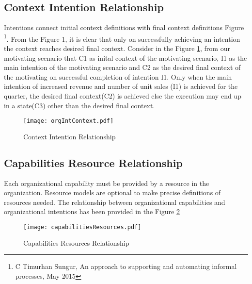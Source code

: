 \subsection{Context Intention Relationship}
\label{sec:ctxintrel}
Intentions connect initial context definitions with final context definitions Figure \footnote{C Timurhan Sungur, An approach to supporting and automating informal processes, May 2015}. From the Figure \ref{fig:orgIntentions}, it is clear that only on successfully achieving an intention the context reaches desired final context. Consider in the Figure \ref{fig:orgIntentions}, from our motivating scenario that C1 as inital context of the motivating scenario, I1 as the main intention of the motivating scenario and C2 as the desired final context of the motivating on successful completion of intention I1. Only when the main intention of increased revenue and number of unit sales (I1) is achieved for the quarter, the desired final context(C2) is achieved else the execution may end up in a state(C3) other than the desired final context. 

\begin{figure}
	\centering
	\texttt{[image: orgIntContext.pdf]}
	\caption{Context Intention Relationship}
	\label{fig:orgIntentions}
\end{figure}

\subsection{Capabilities Resource Relationship}
\label{sec:capIntRel}
Each organizational capability must be provided by a resource in the organization. Resource models are optional to make precise definitions of resources needed. The relationship between organizational capabilities and organizational intentions has been provided in the Figure \ref{fig:capabilitiesresources}
 
\begin{figure}
	\centering
	\texttt{[image: capabilitiesResources.pdf]}
	\caption{Capabilities Resources Relationship}
	\label{fig:capabilitiesresources}
\end{figure}

